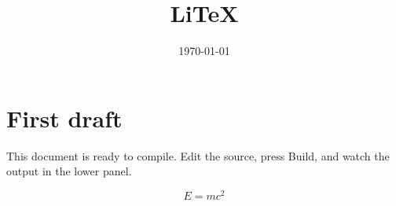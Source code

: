 \documentclass{article}
\title{LiTeX}
\author{}
\date{\today}
\begin{document}
\maketitle

\section{First draft}

This document is ready to compile. Edit the source, press Build, and watch
the output in the lower panel.

\[
  E = mc^2
\]
\end{document}
